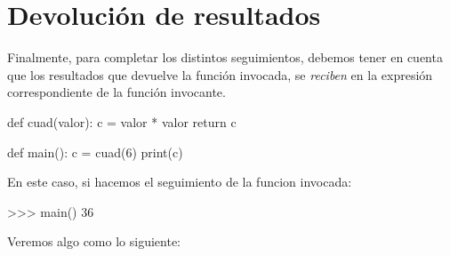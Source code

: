 \section{Devolución de resultados}

Finalmente, para completar los distintos seguimientos, debemos tener en
cuenta que los resultados que devuelve la función invocada, se \emph{reciben}
en la expresión correspondiente de la función invocante.

\begin{codigo-python-sn}
def cuad(valor):
    c = valor * valor
    return c

def main():
    c = cuad(6)
    print(c)
\end{codigo-python-sn}

En este caso, si hacemos el seguimiento de la funcion invocada:
\begin{codigo-python-sn}
>>> main()
36
\end{codigo-python-sn}

Veremos algo como lo siguiente:

